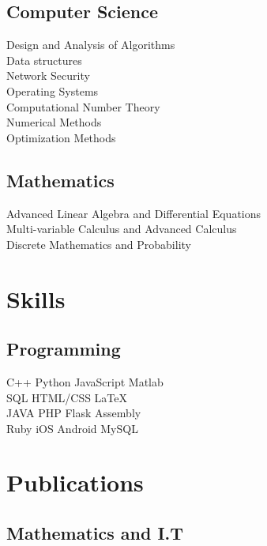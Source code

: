 \documentclass[]{deedy-resume-openfont}
\begin{document}
\begin{minipage}[t]{0.33\textwidth}
\subsection{Computer Science}
Design and Analysis of Algorithms\\
Data structures\\
Network Security\\
Operating Systems\\
Computational Number Theory\\
Numerical Methods\\
Optimization Methods\\
\subsection{Mathematics}
Advanced Linear Algebra and Differential Equations\\
Multi-variable Calculus and Advanced Calculus\\
Discrete Mathematics and Probability\\
\sectionsep



\section{Skills}
\subsection{Programming}
C++ \textbullet{}   Python \textbullet{} JavaScript \textbullet{} Matlab \\
SQL \textbullet{}  HTML/CSS \textbullet{} \LaTeX\ \\ 
JAVA \textbullet{}  PHP  \textbullet{} Flask  \textbullet{}  Assembly \\
Ruby \textbullet{} iOS \textbullet{} Android \textbullet{} MySQL
\sectionsep

\section{Publications} 
\subsection{Mathematics and I.T}
\renewcommand\refname{\vskip -1.5em}


\nocite{*}

%
%

\end{minipage} 
\end{document}
